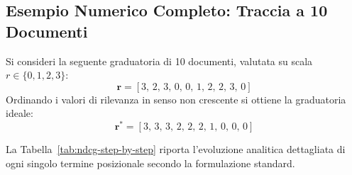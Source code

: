 \FloatBarrier
\subsection{Esempio Numerico Completo: Traccia a 10 Documenti}
\label{subsec:esempio-numerico-dcg-ndcg}

Si consideri la seguente graduatoria di 10 documenti, valutata su scala $r \in \{0, 1, 2, 3\}$:
\begin{equation}
\mathbf{r} = [3, \, 2, \, 3, \, 0, \, 0, \, 1, \, 2, \, 2, \, 3, \, 0]
\end{equation}
Ordinando i valori di rilevanza in senso non crescente si ottiene la graduatoria ideale:
\begin{equation}
\mathbf{r}^* = [3, \, 3, \, 3, \, 2, \, 2, \, 2, \, 1, \, 0, \, 0, \, 0]
\end{equation}

La Tabella~\ref{tab:ndcg-step-by-step} riporta l'evoluzione analitica dettagliata di ogni singolo termine posizionale secondo la formulazione standard.

\begin{table}[H]
\centering
\small
{}
\caption{Computazione analitica passo-passo di $DCG@i$, $IDCG@i$ e $NDCG@i$ per i 10 documenti dell'esempio canonico.}
\label{tab:ndcg-step-by-step}
\end{table}

